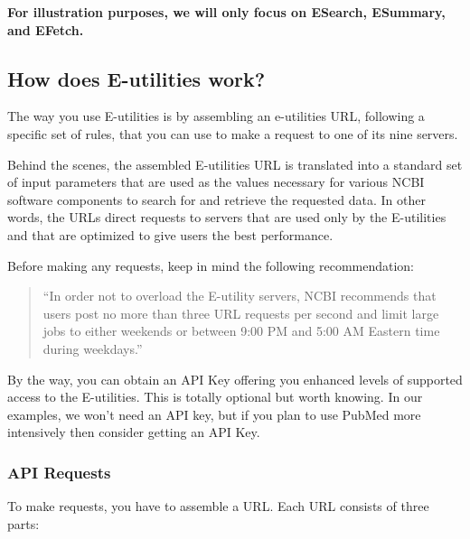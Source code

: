 \documentclass[
]{book}
\begin{document}
\textbf{For illustration purposes, we will only focus on ESearch, ESummary, and EFetch.}

\hypertarget{how-does-e-utilities-work}{%
\subsection{How does E-utilities work?}\label{how-does-e-utilities-work}}

The way you use E-utilities is by assembling an e-utilities URL, following
a specific set of rules, that you can use to make a request to one of its nine
servers.

Behind the scenes, the assembled E-utilities URL is translated into a standard
set of input parameters that are used as the values necessary for various NCBI
software components to search for and retrieve the requested data.
In other words, the URLs direct requests to servers that are used only by the
E-utilities and that are optimized to give users the best performance.

Before making any requests, keep in mind the following recommendation:

\begin{quote}
``In order not to overload the E-utility servers, NCBI recommends that users
post no more than three URL requests per second and limit large jobs to
either weekends or between 9:00 PM and 5:00 AM Eastern time during weekdays.''
\end{quote}

By the way, you can obtain an API Key offering you enhanced levels of supported
access to the E-utilities. This is totally optional but worth knowing. In our
examples, we won't need an API key, but if you plan to use PubMed more intensively
then consider getting an API Key.

\hypertarget{api-requests}{%
\subsubsection*{API Requests}\label{api-requests}}

To make requests, you have to assemble a URL. Each URL consists of three parts:
\end{document}
